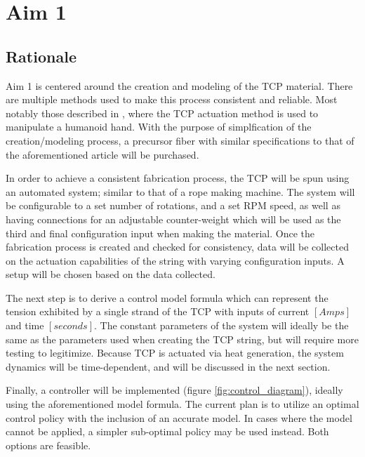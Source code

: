 \section{Aim 1}

\subsection{Rationale}

Aim 1 is centered around the creation and modeling of the TCP material. There are multiple methods used to make this process consistent and reliable. Most notably those described in \cite{wu_compact_2017}, where the TCP actuation method is used to manipulate a humanoid hand. With the purpose of simplfication of the creation/modeling process, a precursor fiber with similar specifications to that of the aforementioned article will be purchased.

In order to achieve a consistent fabrication process, the TCP will be spun using an automated system; similar to that of a rope making machine. The system will be configurable to a set number of rotations, and a set RPM speed, as well as having connections for an adjustable counter-weight which will be used as the third and final configuration input when making the material. Once the fabrication process is created and checked for consistency, data will be collected on the actuation capabilities of the string with varying configuration inputs. A setup will be chosen based on the data collected.

The next step is to derive a control model formula which can represent the tension exhibited by a single strand of the TCP with inputs of current $[Amps]$ and time $[seconds]$. The constant parameters of the system will ideally be the same as the parameters used when creating the TCP string, but will require more testing to legitimize. Because TCP is actuated via heat generation, the system dynamics will be time-dependent, and will be discussed in the next section.

Finally, a controller will be implemented (figure \ref{fig:control_diagram}), ideally using the aforementioned model formula. The current plan is to utilize an optimal control policy with the inclusion of an accurate model. In cases where the model cannot be applied, a simpler sub-optimal policy may be used instead. Both options are feasible.

